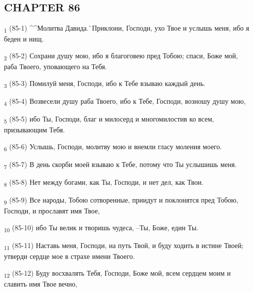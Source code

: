 \subsection{CHAPTER 86}
\begin{tcolorbox}
\textsubscript{1} (85-1) ^^Молитва Давида.^^ Приклони, Господи, ухо Твое и услышь меня, ибо я беден и нищ.
\end{tcolorbox}
\begin{tcolorbox}
\textsubscript{2} (85-2) Сохрани душу мою, ибо я благоговею пред Тобою; спаси, Боже мой, раба Твоего, уповающего на Тебя.
\end{tcolorbox}
\begin{tcolorbox}
\textsubscript{3} (85-3) Помилуй меня, Господи, ибо к Тебе взываю каждый день.
\end{tcolorbox}
\begin{tcolorbox}
\textsubscript{4} (85-4) Возвесели душу раба Твоего, ибо к Тебе, Господи, возношу душу мою,
\end{tcolorbox}
\begin{tcolorbox}
\textsubscript{5} (85-5) ибо Ты, Господи, благ и милосерд и многомилостив ко всем, призывающим Тебя.
\end{tcolorbox}
\begin{tcolorbox}
\textsubscript{6} (85-6) Услышь, Господи, молитву мою и внемли гласу моления моего.
\end{tcolorbox}
\begin{tcolorbox}
\textsubscript{7} (85-7) В день скорби моей взываю к Тебе, потому что Ты услышишь меня.
\end{tcolorbox}
\begin{tcolorbox}
\textsubscript{8} (85-8) Нет между богами, как Ты, Господи, и нет дел, как Твои.
\end{tcolorbox}
\begin{tcolorbox}
\textsubscript{9} (85-9) Все народы, Тобою сотворенные, приидут и поклонятся пред Тобою, Господи, и прославят имя Твое,
\end{tcolorbox}
\begin{tcolorbox}
\textsubscript{10} (85-10) ибо Ты велик и творишь чудеса, --Ты, Боже, един Ты.
\end{tcolorbox}
\begin{tcolorbox}
\textsubscript{11} (85-11) Наставь меня, Господи, на путь Твой, и буду ходить в истине Твоей; утверди сердце мое в страхе имени Твоего.
\end{tcolorbox}
\begin{tcolorbox}
\textsubscript{12} (85-12) Буду восхвалять Тебя, Господи, Боже мой, всем сердцем моим и славить имя Твое вечно,
\end{tcolorbox}
